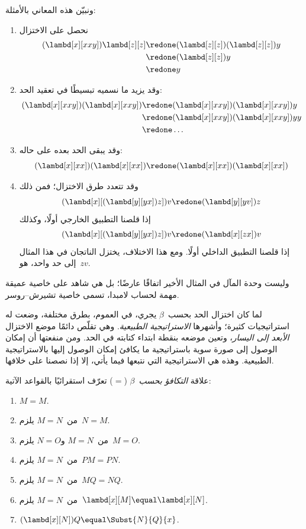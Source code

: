 \documentclass[../../../include/open-logic-section]{subfiles}
\begin{document}
ونبيّن هذه المعاني بالأمثلة:
\begin{enumerate}
\item نحصل على الاختزال
\begin{align*}
(\lambd[x][xxy]) \lambd[z][z] & \redone (\lambd[z][z])(\lambd[z][z]) y \\
& \redone (\lambd[z][z]) y \\
& \redone y
\end{align*}
\item وقد يزيد ما نسميه تبسيطًا في تعقيد الحد:
\begin{align*}
(\lambd[x][xxy])(\lambd[x][xxy]) & \redone (\lambd[x][xxy])(\lambd[x][xxy])y \\
& \redone (\lambd[x][xxy])(\lambd[x][xxy])yy \\
& \redone \dots
\end{align*}
\item وقد يبقى الحد بعده على حاله:
\[
(\lambd[x][xx])(\lambd[x][xx]) \redone (\lambd[x][xx])(\lambd[x][xx])
\]
\item وقد تتعدد طرق الاختزال؛ فمن ذلك
\[
(\lambd[x][(\lambd[y][yx]) z]) v \redone (\lambd[y][yv]) z
\]
إذا قلصنا التطبيق الخارجي أولًا، وكذلك
\[
(\lambd[x][(\lambd[y][yx]) z]) v \redone (\lambd[x][zx]) v
\]
إذا قلصنا التطبيق الداخلي أولًا. ومع هذا الاختلاف، يختزل الناتجان في هذا المثال إلى حد واحد،
هو~$zv$.
\end{enumerate}

وليست وحدة المآل في المثال الأخير اتفاقًا عارضًا؛ بل هي شاهد على خاصية عميقة مهمة لحساب لامبدا،
تسمى خاصية تشيرش--روسر.

\begin{digress}
  لما كان اختزال الحد بحسب~$\beta$ يجري، في العموم، بطرق مختلفة،
  وضعت له استراتيجيات كثيرة؛ وأشهرها \emph{الاستراتيجية الطبيعية}.
  وهي تقلّص دائمًا موضع الاختزال \emph{الأبعد إلى اليسار}،
  وتعين موضعه بنقطة ابتداء كتابته في الحد.
  ومن منفعتها أن إمكان الوصول إلى صورة سوية باستراتيجية ما يكافئ إمكان الوصول إليها بالاستراتيجية الطبيعية.
  وهذه هي الاستراتيجية التي نتبعها فيما يأتي، إلا إذا نصصنا على خلافها.
\end{digress}

\begin{defn}
  علاقة \emph{التكافؤ بحسب~$\beta$} ($\equal$) تعرّف استقرائيًا بالقواعد الآتية:
  \begin{enumerate}
  \item $M \equal M$.
  \item من~$M \equal N$ يلزم~$N \equal M$.
  \item من~$M \equal N$ و$N \equal O$ يلزم~$M \equal O$.
  \item من~$M \equal N$ يلزم~$PM \equal PN$.
  \item من~$M \equal N$ يلزم~$MQ \equal NQ$.
  \item من~$M \equal N$ يلزم~$\lambd[x][M] \equal \lambd[x][N]$.
  \item $(\lambd[x][N])Q \equal \Subst{N}{Q}{x}$.
  \end{enumerate}
\end{defn}
\end{document}
